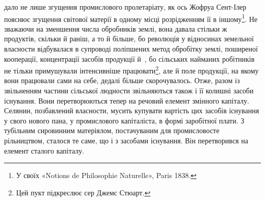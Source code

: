 \parcont{}  %
дало не лише згущення промислового пролетаріату, як ось Жофруа
Сент-Ілер пояснює згущення світової матерії в одному
місці розрідженням її в іншому\footnote{
У своїх «Notions de Philosophie Naturelle», Paris 1838.
}. Не зважаючи на зменшення
числа обробників землі, вона давала стільки ж продуктів, скільки
й раніш, а то й більше, бо революція у відносинах земельної
власности відбувалася в супроводі поліпшених метод обробітку
землі, поширеної кооперації, концентрації засобів продукції й~, бо сільських найманих робітників не тільки примушували
інтенсивніше працювати\footnote{
Цей пукт підкреслює сер Джемс Стюарт.
}, але й поле продукції, на якому
вони працювали сами на себе, дедалі більше скорочувалось.
Отже, разом із звільненням частини сільської людности звільняються
також і її колишні засоби існування. Вони перетворюються
тепер на речовий елемент змінного капіталу. Селянин,
позбавлений власности, мусить купувати вартість цих засобів
існування у свого нового пана, у промислового капіталіста, в
формі заробітної плати. З тубільним сировинним матеріялом,
постачуваним для промисловосте рільництвом, сталося те саме,
що і з засобами існування. Він перетворився на елемент сталого
капіталу.

